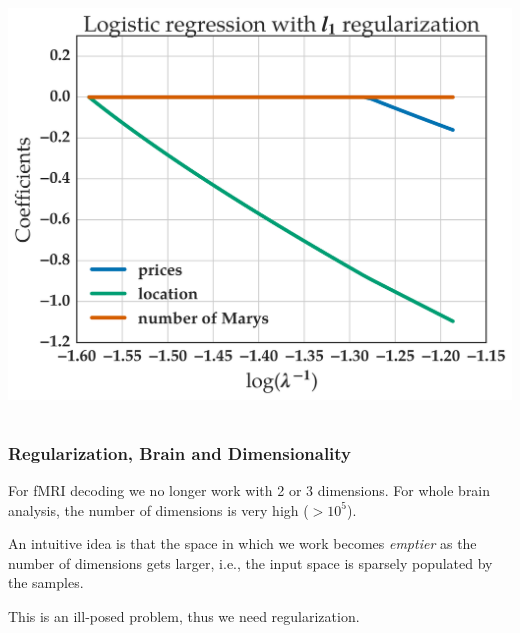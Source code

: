 \documentclass[11pt]{beamer}
\begin{document}
\begin{frame}
\begin{columns}
\begin{column}{0.5\linewidth}
\begin{center}
      \end{center}
      \begin{center}
        \includegraphics[scale=0.2]{figures/logistic_regression_l1_coef_path.png}
      \end{center}
    \end{column}
  \end{columns}
\end{frame}
\begin{frame}
  \frametitle{Regularization, Brain and Dimensionality}
  For fMRI decoding we no longer work with 2 or 3 dimensions. For
  whole brain analysis, the number of dimensions is very high (\(>10^{5}\)).

  An intuitive idea is that the space in which we work becomes \emph{emptier} as
  the number of dimensions gets larger, i.e., the input space is sparsely
  populated by the samples. 

  This is an ill-posed problem, thus we need regularization.

\end{frame}
\end{document}
